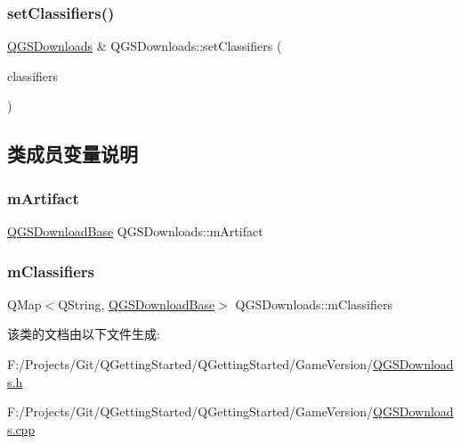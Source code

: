 \mbox{\label{class_q_g_s_downloads_ac16230e102180498beac4e3cc57b68a9}} 
\subsubsection{\texorpdfstring{set\+Classifiers()}{setClassifiers()}}
{\footnotesize\ttfamily \mbox{\hyperlink{class_q_g_s_downloads}{Q\+G\+S\+Downloads}} \& Q\+G\+S\+Downloads\+::set\+Classifiers (\begin{DoxyParamCaption}\item[{const Q\+Map$<$ Q\+String, \mbox{\hyperlink{class_q_g_s_download_base}{Q\+G\+S\+Download\+Base}} $>$ \&}]{classifiers }\end{DoxyParamCaption})}



\subsection{类成员变量说明}
\mbox{\label{class_q_g_s_downloads_acd8639e1d3070fdaf8d96480ab1b509f}} 
\subsubsection{\texorpdfstring{m\+Artifact}{mArtifact}}
{\footnotesize\ttfamily \mbox{\hyperlink{class_q_g_s_download_base}{Q\+G\+S\+Download\+Base}} Q\+G\+S\+Downloads\+::m\+Artifact}

\mbox{\label{class_q_g_s_downloads_a4af8707dddbc0d69c15c194d58741925}} 
\subsubsection{\texorpdfstring{m\+Classifiers}{mClassifiers}}
{\footnotesize\ttfamily Q\+Map$<$Q\+String, \mbox{\hyperlink{class_q_g_s_download_base}{Q\+G\+S\+Download\+Base}}$>$ Q\+G\+S\+Downloads\+::m\+Classifiers}



该类的文档由以下文件生成\+:\begin{DoxyCompactItemize}
\item 
F\+:/\+Projects/\+Git/\+Q\+Getting\+Started/\+Q\+Getting\+Started/\+Game\+Version/\mbox{\hyperlink{_q_g_s_downloads_8h}{Q\+G\+S\+Downloads.\+h}}\item 
F\+:/\+Projects/\+Git/\+Q\+Getting\+Started/\+Q\+Getting\+Started/\+Game\+Version/\mbox{\hyperlink{_q_g_s_downloads_8cpp}{Q\+G\+S\+Downloads.\+cpp}}\end{DoxyCompactItemize}
